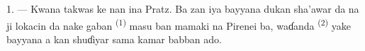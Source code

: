 %
%
%

\VUsaut{4.0mm}
\VUsaut{3.0mm}

\VUsaut{3.0mm}

\VUsaut{3.0mm}

1. --- Kwana takwas ke nan ina Pratz. Ba zan iya bayyana dukan
sha’awar da na ji lokacin da nake gaban 
\textsuperscript{(1)} masu ban mamaki na Pirenei ba, waɗanda
 \textsuperscript{(2)} yake bayyana a kan shuɗiyar sama kamar
babban ado.

